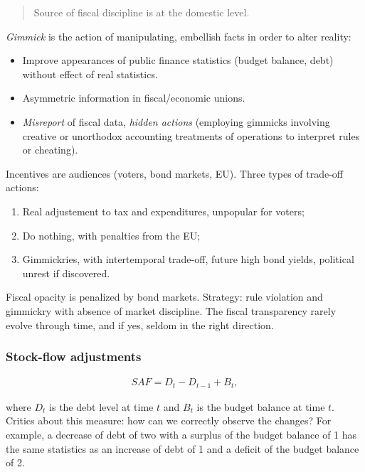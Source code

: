 \begin{quote}
Source of fiscal discipline is at the domestic level.
\end{quote}

\emph{Gimmick} is the action of manipulating, embellish facts in order
to alter reality:

\begin{itemize}
\itemsep1pt\parskip0pt
\item
  Improve appearances of public finance statistics (budget balance,
  debt) without effect of real statistics.
\item
  Asymmetric information in fiscal/economic unions.
\item
  \emph{Misreport} of fiscal data, \emph{hidden actions} (employing
  gimmicks involving creative or unorthodox accounting treatments of
  operations to interpret rules or cheating).
\end{itemize}

Incentives are audiences (voters, bond markets, EU). Three types of
trade-off actions:

\begin{enumerate}
\def\labelenumi{\arabic{enumi}.}
\itemsep1pt\parskip0pt
\item
  Real adjustement to tax and expenditures, unpopular for voters;
\item
  Do nothing, with penalties from the EU;
\item
  Gimmickries, with intertemporal trade-off, future high bond yields,
  political unrest if discovered.
\end{enumerate}

Fiscal opacity is penalized by bond markets. Strategy: rule violation
and gimmickry with absence of market discipline. The fiscal transparency
rarely evolve through time, and if yes, seldom in the right direction.

\subsubsection{Stock-flow adjustments}\label{stock-flow-adjustments}

\begin{align*}
 SAF=  D_t - D_{t-1} + B_t,
\end{align*}

where \(D_t\) is the debt level at time \(t\) and \(B_t\) is the budget
balance at time \(t\). Critics about this measure: how can we correctly
observe the changes? For example, a decrease of debt of two with a
surplus of the budget balance of 1 has the same statistics as an
increase of debt of 1 and a deficit of the budget balance of 2.

